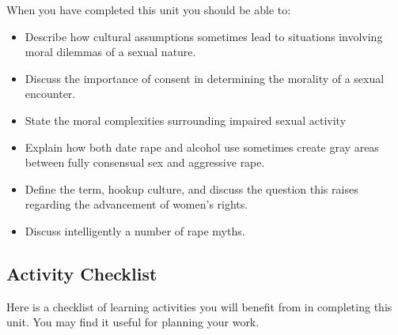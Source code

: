\documentclass[
]{book}
\providecommand{\tightlist}{%
  \setlength{\itemsep}{0pt}\setlength{\parskip}{0pt}}
\begin{document}
When you have completed this unit you should be able to:

\begin{itemize}
\tightlist
\item
  Describe how cultural assumptions sometimes lead to situations involving moral dilemmas of a sexual nature.\\
\item
  Discuss the importance of consent in determining the morality of a sexual encounter.\\
\item
  State the moral complexities surrounding impaired sexual activity
\item
  Explain how both date rape and alcohol use sometimes create gray areas between fully consensual sex and aggressive rape.\\
\item
  Define the term, hookup culture, and discuss the question this raises regarding the advancement of women's rights.\\
\item
  Discuss intelligently a number of rape myths.
\end{itemize}

\hypertarget{activity-checklist-5}{%
\subsection*{Activity Checklist}\label{activity-checklist-5}}

Here is a checklist of learning activities you will benefit from in completing this unit. You may find it useful for planning your work.
\end{document}
